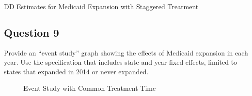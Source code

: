 \documentclass[
]{article}
\begin{document}
\begin{table}

\caption{\label{tbl-ddregs3}DD Estimates for Medicaid Expansion with
Staggered Treatment}


\end{table}%

\subsection{Question 9}\label{question-9}

Provide an ``event study'' graph showing the effects of Medicaid
expansion in each year. Use the specification that includes state and
year fixed effects, limited to states that expanded in 2014 or never
expanded.

\begin{figure}


\caption{\label{fig-eventstudy1}Event Study with Common Treatment Time}

\end{figure}%
\end{document}

